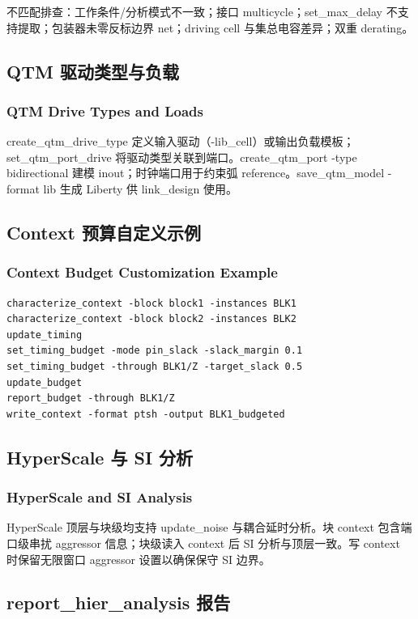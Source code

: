 不匹配排查：工作条件/分析模式不一致；接口 multicycle；set_max_delay 不支持提取；包装器未零反标边界 net；driving cell 与集总电容差异；双重 derating。

\subsection{QTM 驱动类型与负载}
\subsubsection*{QTM Drive Types and Loads}

create_qtm_drive_type 定义输入驱动（-lib_cell）或输出负载模板；set_qtm_port_drive 将驱动类型关联到端口。create_qtm_port -type bidirectional 建模 inout；时钟端口用于约束弧 reference。save_qtm_model -format lib 生成 Liberty 供 link_design 使用。

\subsection{Context 预算自定义示例}
\subsubsection*{Context Budget Customization Example}

\begin{lstlisting}
characterize_context -block block1 -instances BLK1
characterize_context -block block2 -instances BLK2
update_timing
set_timing_budget -mode pin_slack -slack_margin 0.1
set_timing_budget -through BLK1/Z -target_slack 0.5
update_budget
report_budget -through BLK1/Z
write_context -format ptsh -output BLK1_budgeted
\end{lstlisting}

\subsection{HyperScale 与 SI 分析}
\subsubsection*{HyperScale and SI Analysis}

HyperScale 顶层与块级均支持 update_noise 与耦合延时分析。块 context 包含端口级串扰 aggressor 信息；块级读入 context 后 SI 分析与顶层一致。写 context 时保留无限窗口 aggressor 设置以确保保守 SI 边界。

\subsection{report_hier_analysis 报告}
